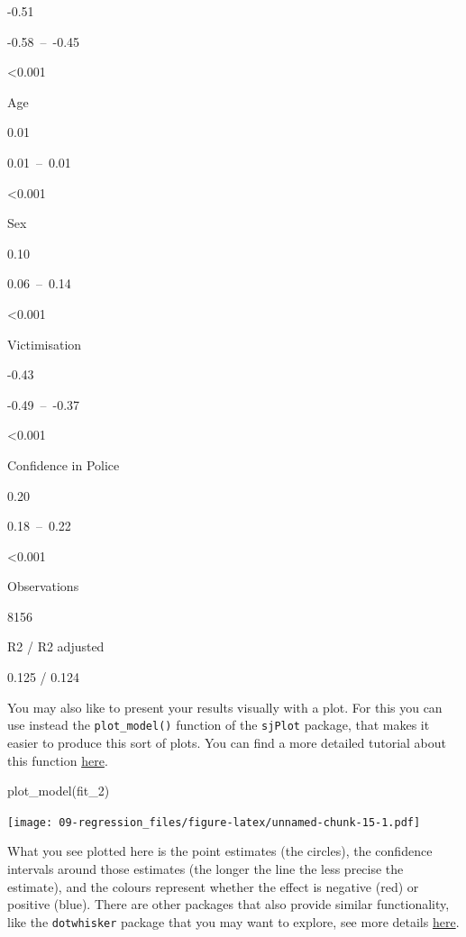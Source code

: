 \documentclass[
]{book}
\newenvironment{Shaded}{\begin{snugshade}}{\end{snugshade}}
\newcommand{\FunctionTok}[1]{\textcolor[rgb]{0.00,0.00,0.00}{#1}}
\newcommand{\NormalTok}[1]{#1}
\begin{document}
-0.51

-0.58~--~-0.45

\textless0.001

Age

0.01

0.01~--~0.01

\textless0.001

Sex

0.10

0.06~--~0.14

\textless0.001

Victimisation

-0.43

-0.49~--~-0.37

\textless0.001

Confidence in Police

0.20

0.18~--~0.22

\textless0.001

Observations

8156

R2 / R2 adjusted

0.125 / 0.124

You may also like to present your results visually with a plot. For this you can use instead the \texttt{plot\_model()} function of the \texttt{sjPlot} package, that makes it easier to produce this sort of plots. You can find a more detailed tutorial about this function \href{https://strengejacke.wordpress.com/2017/10/23/one-function-to-rule-them-all-visualization-of-regression-models-in-rstats-w-sjplot/}{here}.

\begin{Shaded}
\begin{Highlighting}[]
\FunctionTok{plot\_model}\NormalTok{(fit\_2)}
\end{Highlighting}
\end{Shaded}

\texttt{[image: 09-regression\_files/figure-latex/unnamed-chunk-15-1.pdf]}

What you see plotted here is the point estimates (the circles), the confidence intervals around those estimates (the longer the line the less precise the estimate), and the colours represent whether the effect is negative (red) or positive (blue). There are other packages that also provide similar functionality, like the \texttt{dotwhisker} package that you may want to explore, see more details \href{https://cran.r-project.org/web/packages/dotwhisker/vignettes/dotwhisker-vignette.html}{here}.
\end{document}
